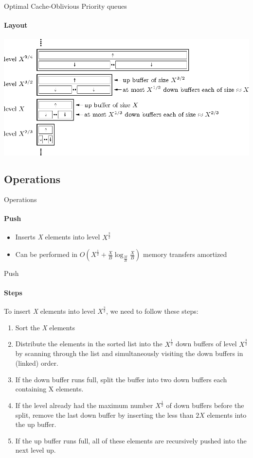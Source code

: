 \documentclass{beamer}
\begin{document}
\begin{darkframes}
    \begin{frame}{Optimal Cache-Oblivious Priority queues}
    \framesubtitle{Layout}
         \includegraphics[width=\textwidth]{resources/queue}
    \end{frame}
    
    \subsection{Operations}

    \begin{frame}{Operations}
    \framesubtitle{Push}
    \begin{itemize}
    \item Inserts \textit{X} elements into level \(X^\frac{3}{2}\)
    \item Can be performed in \(O(X^\frac{1}{2} + \frac{X}{B}\log_\frac{M}{B} \frac{X}{B})\) memory transfers amortized
    \end{itemize}
    \end{frame}
    
    \begin{frame}{Push}
    \framesubtitle{Steps}
    To insert \textit{X} elements into level \(X^\frac{3}{2}\), we need to follow these steps:
    \begin{enumerate}
    \item Sort the \textit{X} elements
    \item Distribute the elements in the sorted list into the \(X^\frac{1}{2}\) down buffers of level \(X^\frac{3}{2}\) by scanning through the list and simultaneously visiting the down buffers in (linked) order.
    \item If the down buffer runs full, split the buffer
into two down buffers each containing X elements.
	\item If the level already had the
maximum number \(X^\frac{1}{2}\) of down buffers before the split, remove the last down buffer by inserting the less than \(2X\) elements  into the up buffer.
	\item If the up buffer runs full, all of these elements are recursively pushed into the next level up.
    \end{enumerate}
    \end{frame}


\end{darkframes}
\end{document}

